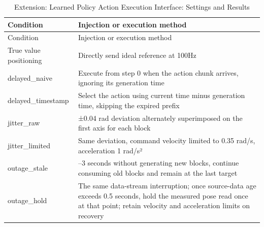 \FloatBarrier\begingroup\small\setlength{\tabcolsep}{2.5pt}
\begin{longtable}[]{@{}
  >{\raggedright\arraybackslash}p{}
  >{\raggedright\arraybackslash}p{}@{}}
\caption{Extension: Learned Policy Action Execution Interface: Settings and Results}\label{tab:s16-1}\tabularnewline
\toprule\noalign{}
\begin{minipage}[b]{\linewidth}\raggedright
Condition
\end{minipage} & \begin{minipage}[b]{\linewidth}\raggedright
Injection or execution method
\end{minipage} \\
\midrule\noalign{}
\endfirsthead
\toprule\noalign{}
\begin{minipage}[b]{\linewidth}\raggedright
Condition
\end{minipage} & \begin{minipage}[b]{\linewidth}\raggedright
Injection or execution method
\end{minipage} \\
\midrule\noalign{}
\endhead
\bottomrule\noalign{}
\endlastfoot
True value positioning & Directly send ideal reference at 100Hz \\
delayed\_naive & Execute from step 0 when the action chunk arrives, ignoring its generation time \\
delayed\_timestamp & Select the action using current time minus generation time, skipping the expired prefix \\
jitter\_raw & ±0.04 rad deviation alternately superimposed on the first axis for each block \\
jitter\_limited & Same deviation, command velocity limited to 0.35 rad/s, acceleration 1 rad/s² \\
outage\_stale & 2--3 seconds without generating new blocks, continue consuming old blocks and remain at the last target \\
outage\_hold & The same data-stream interruption; once source-data age exceeds 0.5 seconds, hold the measured pose read once at that point; retain velocity and acceleration limits on recovery \\
\end{longtable}\endgroup

